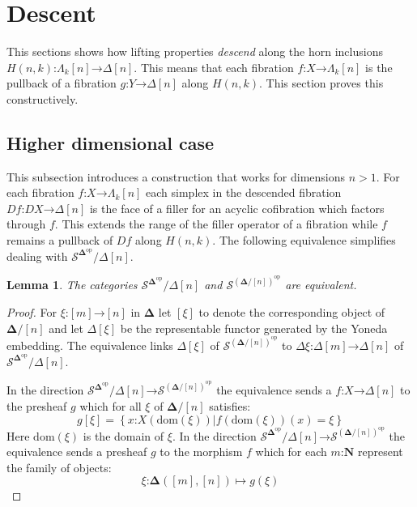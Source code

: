 \documentclass{amsart}
\theoremstyle{plain}
\newtheorem{lemma}[theorem]{Lemma}
\theoremstyle{definition}
\newcommand\cat\mathcal
\newcommand\set[1]{\left\{#1\right\}}
\newcommand\dom{\mathrm{dom}}
\newcommand\nno{\mathbf N}
\newcommand\dual{^{\mathrm{op}}}
\newcommand\simCat{\mathbf\Delta}
\newcommand\s{^{\simCat\dual}}
\newcommand\of{\mathord:}
\renewcommand\to{\mathord\rightarrow}
\newcommand\simplex\Delta
\newcommand\horn\Lambda
\begin{document}
\section{Descent}
This sections shows how lifting properties \emph{descend} along the horn inclusions $H(n,k)\of \horn_k[n]\to\simplex[n]$. This means that each fibration $f\of X\to\horn_k[n]$ is the pullback of a fibration $g\of Y\to\simplex[n]$ along $H(n,k)$. This section proves this constructively.

\subsection{Higher dimensional case}
This subsection introduces a construction that works for dimensions $n>1$. For each fibration $f\of X\to \horn_k[n]$ each simplex in the descended fibration $Df\of DX\to \simplex[n]$ is the face of a filler for an acyclic cofibration which factors through $f$. This extends the range of the filler operator of a fibration while $f$ remains a pullback of $Df$ along $H(n,k)$. The following equivalence simplifies dealing with $\cat S\s/\simplex[n]$.

\begin{lemma} The categories $\cat S\s/\simplex[n]$ and $\cat S^{(\simCat/[n])\dual}$ are equivalent. \label{slice equivalence} \end{lemma}

\begin{proof} For $\xi\of[m]\to[n]$ in $\simCat$ let $[\xi]$ to denote the corresponding object of $\simCat/[n]$ and let $\simplex[\xi]$ be the representable functor generated by the Yoneda embedding. The equivalence links $\simplex[\xi]$ of $\cat S^{(\simCat/[n])\dual}$ to $\Delta\xi\of \simplex[m]\to \simplex[n]$ of $\cat S\s/\simplex[n]$.

In the direction $\cat S\s/\simplex[n]\to \cat S^{(\simCat/[n])\dual}$ the equivalence sends a $f\of X\to \simplex[n]$ to the presheaf $g$ which for all $\xi$ of $\simCat/[n]$ satisfies:
\[ g[\xi] = \set{ x\of X(\dom(\xi)) | f(\dom(\xi))(x)=\xi } \]
Here $\dom(\xi)$ is the domain of $\xi$.
In the direction $\cat S\s/\simplex[n]\to \cat S^{(\simCat/[n])\dual}$ the equivalence sends a presheaf $g$ to the morphism $f$ which for each $m\of\nno$ represent the family of objects:
\[ \xi\of\simCat([m],[n])\mapsto g(\xi) \]
\end{proof}

\end{document}
